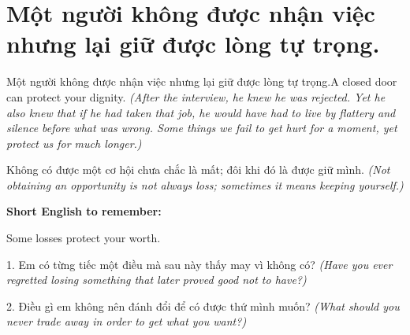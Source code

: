 \section{Một người không được nhận việc nhưng lại giữ được lòng tự trọng.}
\begin{truyen}{Một người không được nhận việc nhưng lại giữ được lòng tự trọng.}{A closed door can protect your dignity.}
\textit{(After the interview, he knew he was rejected. Yet he also knew that if he had taken that job, he would have had to live by flattery and silence before what was wrong. Some things we fail to get hurt for a moment, yet protect us for much longer.)}
\end{truyen}
\begin{baihoc}
Không có được một cơ hội chưa chắc là mất; đôi khi đó là được giữ mình.
\textit{(Not obtaining an opportunity is not always loss; sometimes it means keeping yourself.)}
\end{baihoc}
\begin{ghinhoanh}
\textbf{Short English to remember:}

Some losses protect your worth.
\end{ghinhoanh}
\begin{tuhocnhanh}
1. Em có từng tiếc một điều mà sau này thấy may vì không có? \textit{(Have you ever regretted losing something that later proved good not to have?)}

2. Điều gì em không nên đánh đổi để có được thứ mình muốn? \textit{(What should you never trade away in order to get what you want?)}
\end{tuhocnhanh}
\ngancach

